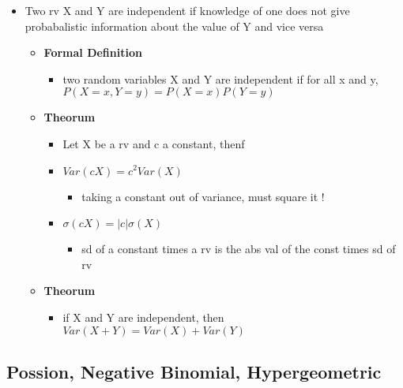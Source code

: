 \documentclass[
]{article}
\providecommand{\tightlist}{%
  \setlength{\itemsep}{0pt}\setlength{\parskip}{0pt}}
\begin{document}
\begin{itemize}
\tightlist
\item
  Two rv X and Y are independent if knowledge of one does not give
  probabalistic information about the value of Y and vice versa

  \begin{itemize}
  \tightlist
  \item
    \textbf{Formal Definition}

    \begin{itemize}
    \tightlist
    \item
      two random variables X and Y are independent if for all x and y,
      \(P(X = x, Y = y) = P(X = x)P(Y = y)\)
    \end{itemize}
  \item
    \textbf{Theorum}

    \begin{itemize}
    \tightlist
    \item
      Let X be a rv and c a constant, thenf
    \item
      \(Var(cX) = c^{2}Var(X)\)

      \begin{itemize}
      \tightlist
      \item
        taking a constant out of variance, must square it !
      \end{itemize}
    \item
      \(\sigma (cX) = |c|\sigma (X)\)

      \begin{itemize}
      \tightlist
      \item
        sd of a constant times a rv is the abs val of the const times sd
        of rv
      \end{itemize}
    \end{itemize}
  \item
    \textbf{Theorum}

    \begin{itemize}
    \tightlist
    \item
      if X and Y are independent, then \(Var(X + Y) = Var(X) + Var(Y)\)
    \end{itemize}
  \end{itemize}
\end{itemize}

\hypertarget{possion-negative-binomial-hypergeometric}{%
\subsection{Possion, Negative Binomial,
Hypergeometric}\label{possion-negative-binomial-hypergeometric}}
\end{document}
